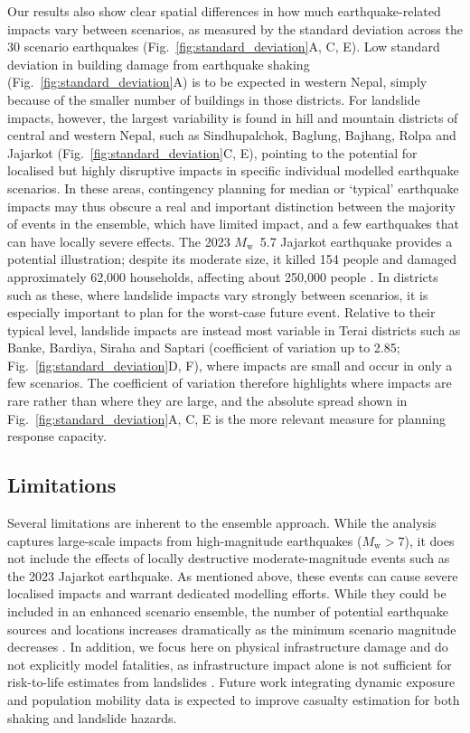 \documentclass[nhess, manuscript]{copernicus}
\begin{document}
Our results also show clear spatial differences in how much earthquake-related impacts vary between scenarios, as measured by the standard deviation across the 30 scenario earthquakes (Fig.~\ref{fig:standard_deviation}A, C, E). Low standard deviation in building damage from earthquake shaking (Fig.~\ref{fig:standard_deviation}A) is to be expected in western Nepal, simply because of the smaller number of buildings in those districts. For landslide impacts, however, the largest variability is found in hill and mountain districts of central and western Nepal, such as Sindhupalchok, Baglung, Bajhang, Rolpa and Jajarkot (Fig.~\ref{fig:standard_deviation}C, E), pointing to the potential for localised but highly disruptive impacts in specific individual modelled earthquake scenarios. In these areas, contingency planning for median or `typical' earthquake impacts may thus obscure a real and important distinction between the majority of events in the ensemble, which have limited impact, and a few earthquakes that can have locally severe effects. The 2023 $M_{\mathrm{w}}$~5.7 Jajarkot earthquake provides a potential illustration; despite its moderate size, it killed 154 people and damaged approximately 62,000 households, affecting about 250,000 people \citep{UNRCO2024}. In districts such as these, where landslide impacts vary strongly between scenarios, it is especially important to plan for the worst-case future event. Relative to their typical level, landslide impacts are instead most variable in Terai districts such as Banke, Bardiya, Siraha and Saptari (coefficient of variation up to 2.85; Fig.~\ref{fig:standard_deviation}D, F), where impacts are small and occur in only a few scenarios. The coefficient of variation therefore highlights where impacts are rare rather than where they are large, and the absolute spread shown in Fig.~\ref{fig:standard_deviation}A, C, E is the more relevant measure for planning response capacity.

\subsection{Limitations}
\label{sec:limitations}

Several limitations are inherent to the ensemble approach. While the analysis captures large-scale impacts from high-magnitude earthquakes ($M_{\mathrm{w}} > 7$), it does not include the effects of locally destructive moderate-magnitude events such as the 2023 Jajarkot earthquake. As mentioned above, these events can cause severe localised impacts and warrant dedicated modelling efforts. While they could be included in an enhanced scenario ensemble, the number of potential earthquake sources and locations increases dramatically as the minimum scenario magnitude decreases \citep{Robinson2018}. In addition, we focus here on physical infrastructure damage and do not explicitly model fatalities, as infrastructure impact alone is not sufficient for risk-to-life estimates from landslides \citep{VanWykDeVries2024}. Future work integrating dynamic exposure and population mobility data is expected to improve casualty estimation for both shaking and landslide hazards.
\end{document}
